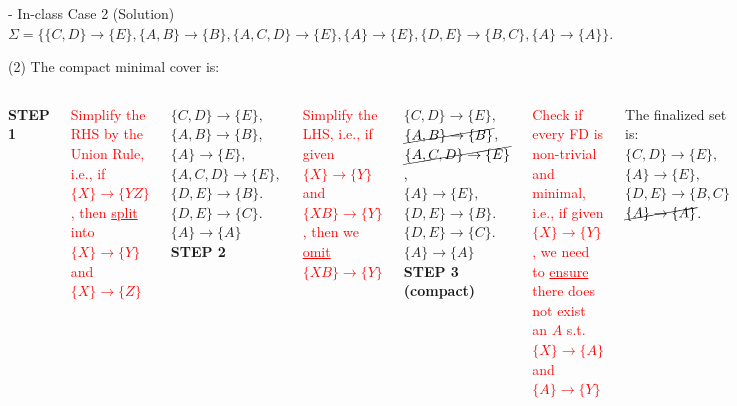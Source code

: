 \begin{frame}[fragile]{ - In-class Case 2 (Solution)}
	$\Sigma=\{\{C,D\} \rightarrow \{E\},\{A,B\} \rightarrow \{B\}, \{A,C,D\} \rightarrow \{E\},\{A\} \rightarrow \{E\},\{D,E\} \rightarrow \{B,C\},\{A\} \rightarrow \{A\}\}.$\\\vspace{5pt}
	
	(2) The compact minimal cover is:\\\vspace{5pt}
	
	\begin{columns}[t]
	 \textbf{STEP 1}\\
	\begin{block}{}
		\tiny \textcolor{red}{Simplify the RHS by the Union Rule, i.e., if $\{X\}\rightarrow \{YZ\}$, then \underline{split} into $\{X\}\rightarrow \{Y\}$ and $\{X\}\rightarrow \{Z\}$}	
	\end{block}
	$\{C,D\} \rightarrow \{E\},$\\
	$\{A,B\} \rightarrow \{B\}$,\\
	$\{A\}  \rightarrow \{E\},$\\
	$\{A,C,D\} \rightarrow \{E\},$\\
	$\{D,E\} \rightarrow \{B\}.$\\
	$\{D,E\} \rightarrow \{C\}.$\\
	$\{A\} \rightarrow \{A\}$\\\vspace{5pt}
	 \textbf{STEP 2}\\
	\begin{block}{}
		\tiny \textcolor{red}{Simplify the LHS, i.e., if given $\{X\}\rightarrow \{Y\}$ and $\{XB\}\rightarrow \{Y\}$, then we \underline{omit} $\{XB\}\rightarrow \{Y\}$}	
	\end{block}
	$\{C,D\} \rightarrow \{E\},$\\
	$\cancel{\{A,B\} \rightarrow \{B\}}$,\\
	$\cancel{\{A,C,D\} \rightarrow \{E\}}$,\\
	$\{A\}  \rightarrow \{E\},$\\
	$\{D,E\} \rightarrow \{B\}.$\\
	$\{D,E\} \rightarrow \{C\}.$\\
	$\{A\} \rightarrow \{A\}$\\\vspace{5pt}
	  \textbf{STEP 3 (compact)}\\	
	\begin{block}{}
		\tiny \textcolor{red}{Check if every FD is non-trivial and minimal, i.e., if given $\{X\}\rightarrow \{Y\}$, we need to \underline{ensure} there does not exist an $A$ s.t. $\{X\}\rightarrow \{A\}$ and $\{A\}\rightarrow \{Y\}$}	
	\end{block}
	The finalized set is:\\
	$\{C,D\} \rightarrow \{E\},$\\
	$\{A\}  \rightarrow \{E\},$\\
	$\{D,E\} \rightarrow \{B, C\}$\\
	$\cancel{\{A\} \rightarrow \{A\}}$.
	\end{columns}
	

\end{frame}
